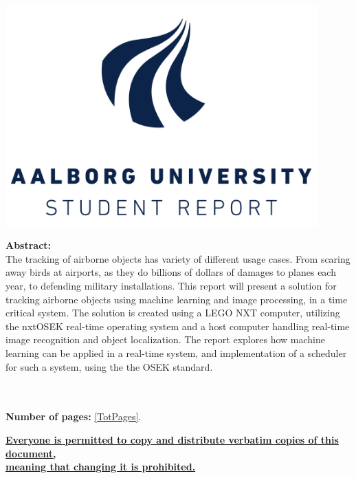 \begin{minipage}[T]{0.45\textwidth}
 \begin{flushright}
  \includegraphics[width=0.9\textwidth]{images/aau_logo.pdf}\\
 \end{flushright}
 \begin{flushleft}
  \textbf{Abstract:}\\
  	The tracking of airborne objects has variety of different usage cases. 
  	From scaring away birds at airports, as they do billions of dollars of damages to planes each year, to defending military installations.
    This report will present a solution for tracking airborne objects using machine learning and image processing, in a time critical system.
    The solution is created using a LEGO NXT computer, utilizing the nxtOSEK real-time operating system and a host computer handling real-time image recognition and object localization.
    The report explores how machine learning can be applied in a real-time system, and implementation of a scheduler for such a system, using the the OSEK standard.
 \end{flushleft}
\end{minipage}\\
\\\large{\textsf{\textbf{\normalsize{Number of pages:}}}} \ref{TotPages}.\\
\begin{center}
 \begin{scriptsize}
  \textbf{\underline{Everyone is permitted to copy and distribute verbatim copies of this document,}}\\ \textbf{\underline{ meaning that changing it is prohibited.}}
 \end{scriptsize}
\end{center}

